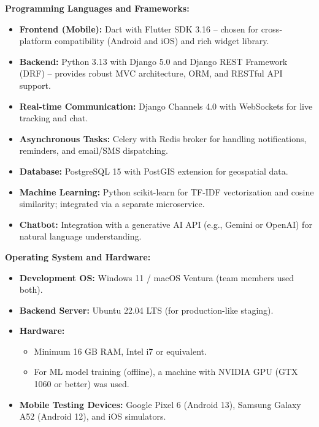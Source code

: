 \textbf{Programming Languages and Frameworks:}
\begin{itemize}
    \item \textbf{Frontend (Mobile):} Dart with Flutter SDK 3.16 – chosen for cross-platform compatibility (Android and iOS) and rich widget library.
    \item \textbf{Backend:} Python 3.13 with Django 5.0 and Django REST Framework (DRF) – provides robust MVC architecture, ORM, and RESTful API support.
    \item \textbf{Real-time Communication:} Django Channels 4.0 with WebSockets for live tracking and chat.
    \item \textbf{Asynchronous Tasks:} Celery with Redis broker for handling notifications, reminders, and email/SMS dispatching.
    \item \textbf{Database:} PostgreSQL 15 with PostGIS extension for geospatial data.
    \item \textbf{Machine Learning:} Python scikit-learn for TF-IDF vectorization and cosine similarity; integrated via a separate microservice.
    \item \textbf{Chatbot:} Integration with a generative AI API (e.g., Gemini or OpenAI) for natural language understanding.
\end{itemize}

\textbf{Operating System and Hardware:}
\begin{itemize}
    \item \textbf{Development OS:} Windows 11 / macOS Ventura (team members used both).
    \item \textbf{Backend Server:} Ubuntu 22.04 LTS (for production-like staging).
    \item \textbf{Hardware:} 
        \begin{itemize}
            \item Minimum 16 GB RAM, Intel i7 or equivalent.
            \item For ML model training (offline), a machine with NVIDIA GPU (GTX 1060 or better) was used.
        \end{itemize}
    \item \textbf{Mobile Testing Devices:} Google Pixel 6 (Android 13), Samsung Galaxy A52 (Android 12), and iOS simulators.
\end{itemize}


